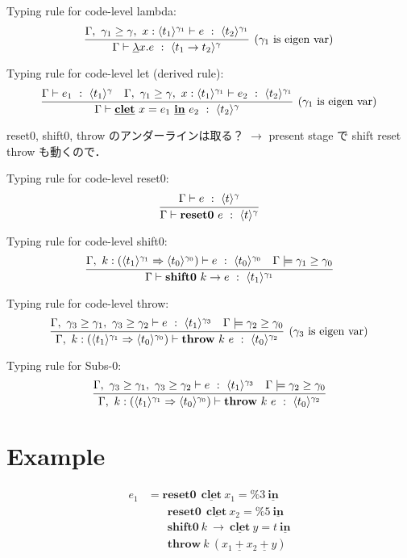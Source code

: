 \documentclass[10pt,a4j]{jarticle}
\newcommand\Resetz{\textbf{reset0}}
\newcommand\Shiftz{\textbf{shift0}}
\newcommand\Throw{\textbf{throw}}
\newcommand\resetz[1]{\Resetz~{#1}}
\newcommand\shiftz[2]{\Shiftz~{#1}\to{#2}}
\newcommand\throw[2]{\Throw~{#1}~{#2}}
\newcommand\cfun[2]{\underline{\lambda}{#1}.{#2}}
\newcommand\cPlus{\underline{\textbf{+}}}
\newcommand\cLet{\underline{\textbf{clet}}}
\newcommand\cIn{\underline{\textbf{in}}}
\newcommand\clet[3]{\cLet~{#1}={#2}~\cIn~{#3}}
\newcommand\csp[1]{\texttt{\%}{#1}}
\newcommand\codeT[2]{\langle{#1}\rangle^{#2}}
\newcommand\contT[2]{({#1} \Rightarrow {#2})}
\newcommand\ord{\ge}
\theoremstyle{break}
\begin{document}
Typing rule for code-level lambda:
\[
  \infer[(\gamma_1~\text{is eigen var})]
  {\Gamma \vdash \cfun{x}{e} ~:~ \codeT{t_1\to t_2}{\gamma}}
  {\Gamma,~\gamma_1 \ord \gamma,~x:\codeT{t_1}{\gamma_1} \vdash e
    ~:~ \codeT{t_2}{\gamma_1}}
\]

Typing rule for code-level let (derived rule):
\[
  \infer[(\gamma_1~\text{is eigen var})]
  {\Gamma \vdash \clet{x}{e_1}{e_2} ~:~ \codeT{t_2}{\gamma}}
  {\Gamma \vdash e_1 ~:~ \codeT{t_1}{\gamma}
    &\Gamma,~\gamma_1 \ord \gamma,~x:\codeT{t_1}{\gamma_1} \vdash
    e_2 ~:~ \codeT{t_2}{\gamma_1}
  }
\]

reset0, shift0, throw のアンダーラインは取る？
$\rightarrow$ present stage で shift reset throw も動くので．

Typing rule for code-level reset0:
\[
  \infer{\Gamma \vdash \resetz{e} ~:~ \codeT{t}{\gamma}}
  {\Gamma \vdash e ~:~ \codeT{t}{\gamma}}
\]

Typing rule for code-level shift0:
\[
  \infer{\Gamma \vdash \shiftz{k}{e} ~:~ \codeT{t_1}{\gamma_1}}
  {\Gamma,~k:\contT{\codeT{t_1}{\gamma_1}}{\codeT{t_0}{\gamma_0}}
    \vdash e ~:~ \codeT{t_0}{\gamma_0}
    & \Gamma \models \gamma_1 \ord \gamma_0
  }
\]

Typing rule for code-level throw:
\[
  \infer[(\gamma_3~\text{is eigen var})]
  {\Gamma,~k:\contT{\codeT{t_1}{\gamma_1}}{\codeT{t_0}{\gamma_0}}
    \vdash \throw{k}{e} ~:~ \codeT{t_0}{\gamma_2}}
  {\Gamma,~
    \gamma_3 \ord \gamma_1,~
    \gamma_3 \ord \gamma_2
    \vdash e ~:~ \codeT{t_1}{\gamma_3}
    & \Gamma \models \gamma_2 \ord \gamma_0
  }
\]

Typing rule for Subs-0:
\[
  \infer
  {\Gamma,~k:\contT{\codeT{t_1}{\gamma_1}}{\codeT{t_0}{\gamma_0}}
    \vdash \throw{k}{e} ~:~ \codeT{t_0}{\gamma_2}}
  {\Gamma,~
    \gamma_3 \ord \gamma_1,~
    \gamma_3 \ord \gamma_2
    \vdash e ~:~ \codeT{t_1}{\gamma_3}
    & \Gamma \models \gamma_2 \ord \gamma_0
  }
\]

\section{Example}

\begin{align*}
  e_1 & = \Resetz ~~\cLet~x_1=\csp{3}~\cIn \\
      & \phantom{=}~~ \Resetz ~~\cLet~x_2=\csp{5}~\cIn \\
      & \phantom{=}~~ \Shiftz~k~\to~\cLet~y=t~\cIn \\
      & \phantom{=}~~ \Throw~k~(x_1~\cPlus~x_2~\cPlus~y)
\end{align*}
\end{document}
